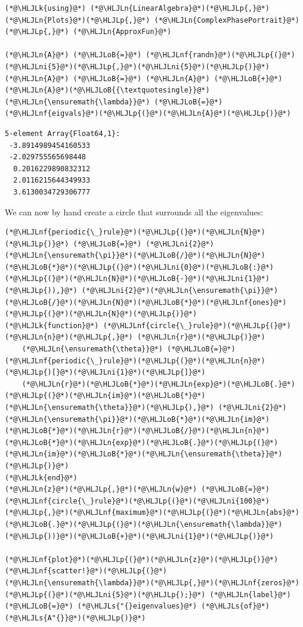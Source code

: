 \documentclass[12pt,a4paper]{article}
\newcommand{\HLJLk}[1]{\textcolor[RGB]{148,91,176}{\textbf{#1}}}
\newcommand{\HLJLn}[1]{#1}
\newcommand{\HLJLnf}[1]{\textcolor[RGB]{66,102,213}{#1}}
\newcommand{\HLJLs}[1]{\textcolor[RGB]{201,61,57}{#1}}
\newcommand{\HLJLni}[1]{\textcolor[RGB]{59,151,46}{#1}}
\newcommand{\HLJLoB}[1]{\textcolor[RGB]{102,102,102}{\textbf{#1}}}
\newcommand{\HLJLp}[1]{#1}
\begin{document}
\begin{lstlisting}
(*@\HLJLk{using}@*) (*@\HLJLn{LinearAlgebra}@*)(*@\HLJLp{,}@*) (*@\HLJLn{Plots}@*)(*@\HLJLp{,}@*) (*@\HLJLn{ComplexPhasePortrait}@*)(*@\HLJLp{,}@*) (*@\HLJLn{ApproxFun}@*)

(*@\HLJLn{A}@*) (*@\HLJLoB{=}@*) (*@\HLJLnf{randn}@*)(*@\HLJLp{(}@*)(*@\HLJLni{5}@*)(*@\HLJLp{,}@*)(*@\HLJLni{5}@*)(*@\HLJLp{)}@*)
(*@\HLJLn{A}@*) (*@\HLJLoB{=}@*) (*@\HLJLn{A}@*) (*@\HLJLoB{+}@*) (*@\HLJLn{A}@*)(*@\HLJLoB{{\textquotesingle}}@*)
(*@\HLJLn{\ensuremath{\lambda}}@*) (*@\HLJLoB{=}@*) (*@\HLJLnf{eigvals}@*)(*@\HLJLp{(}@*)(*@\HLJLn{A}@*)(*@\HLJLp{)}@*)
\end{lstlisting}

\begin{lstlisting}
5-element Array{Float64,1}:
 -3.8914989454160533
 -2.029755565698448 
  0.2016229890832312
  2.0116215644349933
  3.6130034729306777
\end{lstlisting}


We can now by hand create a circle that surrounds all the eigenvalues:


\begin{lstlisting}
(*@\HLJLnf{periodic{\_}rule}@*)(*@\HLJLp{(}@*)(*@\HLJLn{N}@*)(*@\HLJLp{)}@*) (*@\HLJLoB{=}@*) (*@\HLJLni{2}@*)(*@\HLJLn{\ensuremath{\pi}}@*)(*@\HLJLoB{/}@*)(*@\HLJLn{N}@*)(*@\HLJLoB{*}@*)(*@\HLJLp{(}@*)(*@\HLJLni{0}@*)(*@\HLJLoB{:}@*)(*@\HLJLp{(}@*)(*@\HLJLn{N}@*)(*@\HLJLoB{-}@*)(*@\HLJLni{1}@*)(*@\HLJLp{)),}@*) (*@\HLJLni{2}@*)(*@\HLJLn{\ensuremath{\pi}}@*)(*@\HLJLoB{/}@*)(*@\HLJLn{N}@*)(*@\HLJLoB{*}@*)(*@\HLJLnf{ones}@*)(*@\HLJLp{(}@*)(*@\HLJLn{N}@*)(*@\HLJLp{)}@*)
(*@\HLJLk{function}@*) (*@\HLJLnf{circle{\_}rule}@*)(*@\HLJLp{(}@*)(*@\HLJLn{n}@*)(*@\HLJLp{,}@*) (*@\HLJLn{r}@*)(*@\HLJLp{)}@*) 
    (*@\HLJLn{\ensuremath{\theta}}@*) (*@\HLJLoB{=}@*) (*@\HLJLnf{periodic{\_}rule}@*)(*@\HLJLp{(}@*)(*@\HLJLn{n}@*)(*@\HLJLp{)[}@*)(*@\HLJLni{1}@*)(*@\HLJLp{]}@*)
    (*@\HLJLn{r}@*)(*@\HLJLoB{*}@*)(*@\HLJLn{exp}@*)(*@\HLJLoB{.}@*)(*@\HLJLp{(}@*)(*@\HLJLn{im}@*)(*@\HLJLoB{*}@*)(*@\HLJLn{\ensuremath{\theta}}@*)(*@\HLJLp{),}@*) (*@\HLJLni{2}@*)(*@\HLJLn{\ensuremath{\pi}}@*)(*@\HLJLoB{*}@*)(*@\HLJLn{im}@*)(*@\HLJLoB{*}@*)(*@\HLJLn{r}@*)(*@\HLJLoB{/}@*)(*@\HLJLn{n}@*)(*@\HLJLoB{*}@*)(*@\HLJLn{exp}@*)(*@\HLJLoB{.}@*)(*@\HLJLp{(}@*)(*@\HLJLn{im}@*)(*@\HLJLoB{*}@*)(*@\HLJLn{\ensuremath{\theta}}@*)(*@\HLJLp{)}@*)
(*@\HLJLk{end}@*)
(*@\HLJLn{z}@*)(*@\HLJLp{,}@*)(*@\HLJLn{w}@*) (*@\HLJLoB{=}@*) (*@\HLJLnf{circle{\_}rule}@*)(*@\HLJLp{(}@*)(*@\HLJLni{100}@*)(*@\HLJLp{,}@*)(*@\HLJLnf{maximum}@*)(*@\HLJLp{(}@*)(*@\HLJLn{abs}@*)(*@\HLJLoB{.}@*)(*@\HLJLp{(}@*)(*@\HLJLn{\ensuremath{\lambda}}@*)(*@\HLJLp{))}@*)(*@\HLJLoB{+}@*)(*@\HLJLni{1}@*)(*@\HLJLp{)}@*)

(*@\HLJLnf{plot}@*)(*@\HLJLp{(}@*)(*@\HLJLn{z}@*)(*@\HLJLp{)}@*)
(*@\HLJLnf{scatter!}@*)(*@\HLJLp{(}@*)(*@\HLJLn{\ensuremath{\lambda}}@*)(*@\HLJLp{,}@*)(*@\HLJLnf{zeros}@*)(*@\HLJLp{(}@*)(*@\HLJLni{5}@*)(*@\HLJLp{);}@*) (*@\HLJLn{label}@*) (*@\HLJLoB{=}@*) (*@\HLJLs{"{}eigenvalues}@*) (*@\HLJLs{of}@*) (*@\HLJLs{A"{}}@*)(*@\HLJLp{)}@*)
\end{lstlisting}
\end{document}
